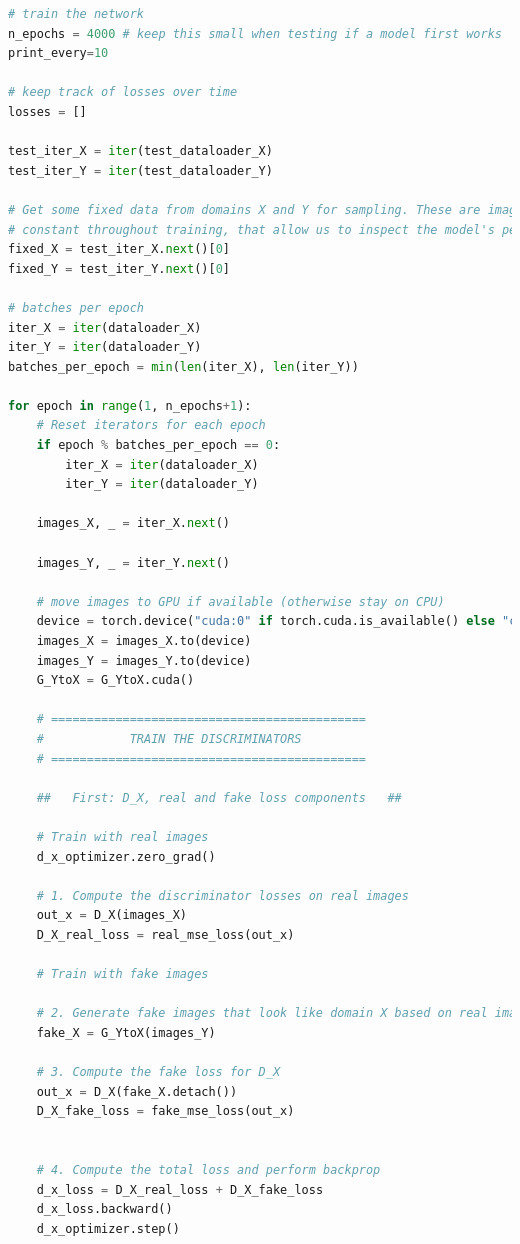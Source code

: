 \begin{lstlisting}[language=Python]
# train the network
n_epochs = 4000 # keep this small when testing if a model first works
print_every=10
    
# keep track of losses over time
losses = []

test_iter_X = iter(test_dataloader_X)
test_iter_Y = iter(test_dataloader_Y)

# Get some fixed data from domains X and Y for sampling. These are images that are held
# constant throughout training, that allow us to inspect the model's performance.
fixed_X = test_iter_X.next()[0]
fixed_Y = test_iter_Y.next()[0]

# batches per epoch
iter_X = iter(dataloader_X)
iter_Y = iter(dataloader_Y)
batches_per_epoch = min(len(iter_X), len(iter_Y))

for epoch in range(1, n_epochs+1):
    # Reset iterators for each epoch
    if epoch % batches_per_epoch == 0:
        iter_X = iter(dataloader_X)
        iter_Y = iter(dataloader_Y)

    images_X, _ = iter_X.next()

    images_Y, _ = iter_Y.next()

    # move images to GPU if available (otherwise stay on CPU)
    device = torch.device("cuda:0" if torch.cuda.is_available() else "cpu")
    images_X = images_X.to(device)
    images_Y = images_Y.to(device)
    G_YtoX = G_YtoX.cuda()

    # ============================================
    #            TRAIN THE DISCRIMINATORS
    # ============================================

    ##   First: D_X, real and fake loss components   ##

    # Train with real images
    d_x_optimizer.zero_grad()

    # 1. Compute the discriminator losses on real images
    out_x = D_X(images_X)
    D_X_real_loss = real_mse_loss(out_x)

    # Train with fake images

    # 2. Generate fake images that look like domain X based on real images in domain Y
    fake_X = G_YtoX(images_Y)

    # 3. Compute the fake loss for D_X
    out_x = D_X(fake_X.detach())
    D_X_fake_loss = fake_mse_loss(out_x)


    # 4. Compute the total loss and perform backprop
    d_x_loss = D_X_real_loss + D_X_fake_loss
    d_x_loss.backward()
    d_x_optimizer.step()



\end{lstlisting}

